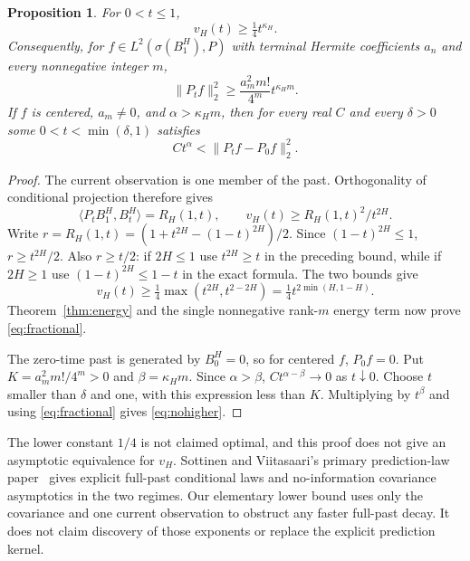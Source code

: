 \documentclass[11pt]{article}
\newtheorem{proposition}[theorem]{Proposition}
\begin{document}
\begin{proposition}\label{prop:variance}
For $0<t\leq1$,
\begin{equation}\label{eq:variance}
 v_H(t)\geq\tfrac14t^{\kappa_H}.
\end{equation}
Consequently, for $f\in L^2(\sigma(B_1^H),P)$ with terminal Hermite
coefficients $a_n$ and every nonnegative integer $m$,
\begin{equation}\label{eq:fractional}
 \|P_tf\|_2^2\geq\frac{a_m^2m!}{4^m}t^{\kappa_Hm}.
\end{equation}
If $f$ is centered, $a_m\ne0$, and $\alpha>\kappa_Hm$, then for every
real $C$ and every $\delta>0$ some $0<t<\min(\delta,1)$ satisfies
\begin{equation}\label{eq:nohigher}
 C t^\alpha<\|P_tf-P_0f\|_2^2.
\end{equation}
\end{proposition}
\begin{proof}
The current observation is one member of the past. Orthogonality of
conditional projection therefore gives
\[
 \langle P_tB_1^H,B_t^H\rangle=R_H(1,t),\qquad
 v_H(t)\geq R_H(1,t)^2/t^{2H}.
\]
Write $r=R_H(1,t)=(1+t^{2H}-(1-t)^{2H})/2$.
Since $(1-t)^{2H}\leq1$, $r\geq t^{2H}/2$.
Also $r\geq t/2$: if $2H\leq1$ use $t^{2H}\geq t$ in the preceding
bound, while if $2H\geq1$ use $(1-t)^{2H}\leq1-t$ in the exact formula.
The two bounds give
\[
 v_H(t)\geq\tfrac14\max(t^{2H},t^{2-2H})
          =\tfrac14t^{2\min(H,1-H)}.
\]
Theorem~\ref{thm:energy} and the single nonnegative rank-$m$ energy term
now prove \eqref{eq:fractional}.

The zero-time past is generated by $B_0^H=0$, so for centered $f$,
$P_0f=0$. Put $K=a_m^2m!/4^m>0$ and $\beta=\kappa_Hm$.
Since $\alpha>\beta$, $Ct^{\alpha-\beta}\to0$ as $t\downarrow0$.
Choose $t$ smaller than $\delta$ and one, with this expression less
than $K$. Multiplying by $t^\beta$ and using
\eqref{eq:fractional} gives \eqref{eq:nohigher}.
\end{proof}

The lower constant $1/4$ is not claimed optimal, and this proof does not
give an asymptotic equivalence for $v_H$. Sottinen and Viitasaari's
primary prediction-law paper~\cite{SV} gives explicit full-past
conditional laws and no-information covariance asymptotics in the
two regimes. Our elementary lower bound uses only the covariance and
one current observation to obstruct any faster full-past decay. It
does not claim discovery of those exponents or replace the explicit
prediction kernel.
\end{document}

